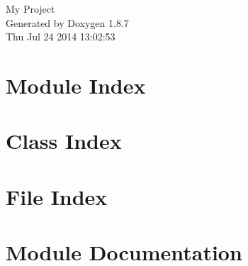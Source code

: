 \documentclass[twoside]{book}
\newcommand{\+}{\discretionary{\mbox{\scriptsize$\hookleftarrow$}}{}{}}
\newcommand{\clearemptydoublepage}{%
  \newpage{\pagestyle{empty}\cleardoublepage}%
}
\begin{document}
\hypersetup{pageanchor=false,
             bookmarks=true,
             bookmarksnumbered=true,
             pdfencoding=unicode
            }
\begin{titlepage}
\vspace*{7cm}
\begin{center}%
{\Large My Project }\\
\vspace*{1cm}
{\large Generated by Doxygen 1.8.7}\\
\vspace*{0.5cm}
{\small Thu Jul 24 2014 13:02:53}\\
\end{center}
\end{titlepage}
\clearemptydoublepage
\tableofcontents
\clearemptydoublepage
{}
\hypersetup{pageanchor=true}

\chapter{Module Index}

\chapter{Class Index}

\chapter{File Index}

\chapter{Module Documentation}




















\end{document}
